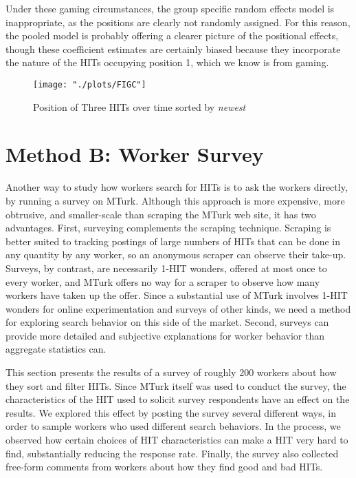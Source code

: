 \documentclass{acm_proc_article-sp}
\begin{document}
Under these gaming circumstances, the group specific random effects
model is inappropriate, as the positions are clearly not randomly
assigned.  For this reason, the pooled model is probably offering a
clearer picture of the positional effects, though these coefficient
estimates are certainly biased because they incorporate the nature of
the HITs occupying position 1, which we know is from gaming.

\begin{figure}
\centering
\texttt{[image: "./plots/FIGC"]}
\caption{ Position of Three HITs over time sorted by {\em newest} \label{fig:C}} 
\end{figure}

\section{Method B: Worker Survey}
Another way to study how workers search for HITs is to ask the workers
directly, by running a survey on MTurk. Although this approach is more
expensive, more obtrusive, and smaller-scale than scraping the MTurk
web site, it has two advantages.  First, surveying complements the
scraping technique.  Scraping is better suited to tracking postings of
large numbers of HITs that can be done in any quantity by any worker,
so an anonymous scraper can observe their take-up.  Surveys, by
contrast, are necessarily 1-HIT wonders, offered at most once to every
worker, and MTurk offers no way for a scraper to observe how many
workers have taken up the offer.  Since a substantial use of MTurk
involves 1-HIT wonders for online experimentation and surveys of other
kinds, we need a method for exploring search behavior on this side of
the market.  Second, surveys can provide more detailed and subjective
explanations for worker behavior than aggregate statistics can.

This section presents the results of a survey of roughly 200 workers
about how they sort and filter HITs. Since MTurk itself was used to
conduct the survey, the characteristics of the HIT used to solicit
survey respondents have an effect on the results.  We explored this
effect by posting the survey several different ways, in order to
sample workers who used different search behaviors.  In the process,
we observed how certain choices of HIT characteristics can make a HIT
very hard to find, substantially reducing the response rate.  Finally,
the survey also collected free-form comments from workers about how
they find good and bad HITs.
\end{document}
